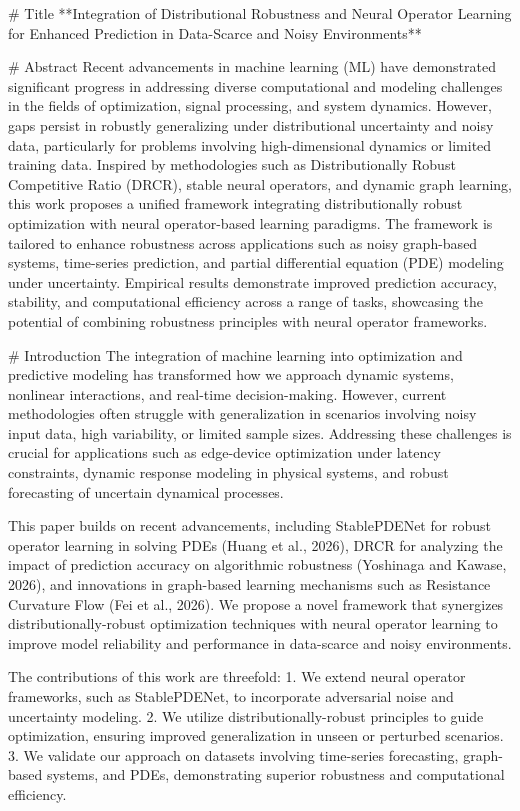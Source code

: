 # Title  
**Integration of Distributional Robustness and Neural Operator Learning for Enhanced Prediction in Data-Scarce and Noisy Environments**

# Abstract  
Recent advancements in machine learning (ML) have demonstrated significant progress in addressing diverse computational and modeling challenges in the fields of optimization, signal processing, and system dynamics. However, gaps persist in robustly generalizing under distributional uncertainty and noisy data, particularly for problems involving high-dimensional dynamics or limited training data. Inspired by methodologies such as Distributionally Robust Competitive Ratio (DRCR), stable neural operators, and dynamic graph learning, this work proposes a unified framework integrating distributionally robust optimization with neural operator-based learning paradigms. The framework is tailored to enhance robustness across applications such as noisy graph-based systems, time-series prediction, and partial differential equation (PDE) modeling under uncertainty. Empirical results demonstrate improved prediction accuracy, stability, and computational efficiency across a range of tasks, showcasing the potential of combining robustness principles with neural operator frameworks.

# Introduction  
The integration of machine learning into optimization and predictive modeling has transformed how we approach dynamic systems, nonlinear interactions, and real-time decision-making. However, current methodologies often struggle with generalization in scenarios involving noisy input data, high variability, or limited sample sizes. Addressing these challenges is crucial for applications such as edge-device optimization under latency constraints, dynamic response modeling in physical systems, and robust forecasting of uncertain dynamical processes.

This paper builds on recent advancements, including StablePDENet for robust operator learning in solving PDEs (Huang et al., 2026), DRCR for analyzing the impact of prediction accuracy on algorithmic robustness (Yoshinaga and Kawase, 2026), and innovations in graph-based learning mechanisms such as Resistance Curvature Flow (Fei et al., 2026). We propose a novel framework that synergizes distributionally-robust optimization techniques with neural operator learning to improve model reliability and performance in data-scarce and noisy environments.

The contributions of this work are threefold:
1. We extend neural operator frameworks, such as StablePDENet, to incorporate adversarial noise and uncertainty modeling.
2. We utilize distributionally-robust principles to guide optimization, ensuring improved generalization in unseen or perturbed scenarios.
3. We validate our approach on datasets involving time-series forecasting, graph-based systems, and PDEs, demonstrating superior robustness and computational efficiency.

